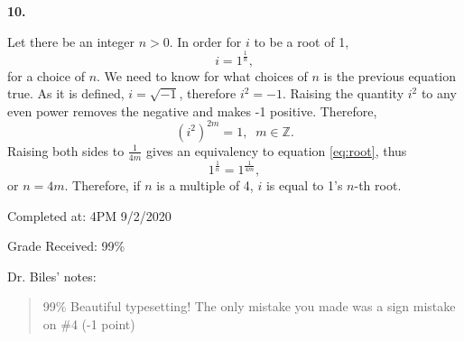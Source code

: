 \documentclass{article}
\newcommand{\qnumber}[1]{
\vspace{0.5cm}
\noindent
\textbf{#1.}
\vspace{4mm}
}
\begin{document}
\qnumber{10}

Let there be an integer $n>0$. In order for $i$ to be a root of 1,
\begin{equation} \label{eq:root}
    i=1^\frac{1}{n},  
\end{equation}
for a choice of $n$. We need to know for what choices of $n$ is the previous equation true. As it is defined, $i=\sqrt{-1}$, therefore $i^2=-1$. Raising the quantity $i^2$ to any even power removes the negative and makes -1 positive. Therefore,
\[
    (i^2)^{2m}=1,\;\;m\in\mathbb{Z}.  
\]
Raising both sides to $\frac{1}{4m}$ gives an equivalency to equation \ref{eq:root}, thus
\[
    1^\frac{1}{n}=1^\frac{1}{4m},  
\]
or $n=4m$. Therefore, if $n$ is a multiple of 4, $i$ is equal to 1's $n$-th root.

\vspace{2cm}

\noindent
Completed at: 4PM 9/2/2020

\noindent
Grade Received: 99\%

\noindent
Dr. Biles' notes: 
\begin{quotation}
    99\%  Beautiful typesetting!  The only mistake you made was a sign mistake on \#4 (-1 point)
\end{quotation}
\end{document}
